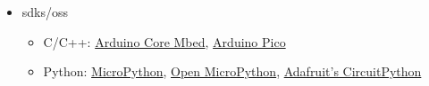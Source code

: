 \begin{frame}
\begin{itemize}
\begin{itemize}
              \end{itemize}
        \item \aclp{sdk}/\aclp{os}
              \begin{itemize}
                  \item C/C++: \href{https://github.com/arduino/ArduinoCore-mbed/releases/tag/2.0.0}{Arduino\textregistered{} Core Mbed}, \href{https://github.com/earlephilhower/arduino-pico}{Arduino\textregistered{} Pico}
                  \item Python: \href{https://micropython.org/download/ARDUINO\_NANO\_RP2040\_CONNECT/}{MicroPython}, \href{https://github.com/openmv/openmv/releases}{Open MicroPython}, \href{https://circuitpython.org/board/arduino\_nano\_rp2040\_connect/}{Adafruit's CircuitPython}
              \end{itemize}
    \end{itemize}
\end{frame}